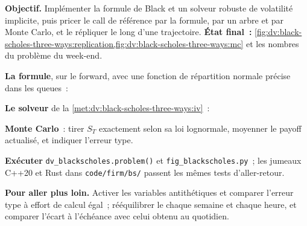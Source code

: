\begin{tutorial}
\textbf{Objectif.} Implémenter la formule de Black et un solveur robuste de volatilité implicite,
puis pricer le call de référence par la formule, par un arbre et par Monte Carlo, et le répliquer
le long d'une trajectoire. \textbf{État final~:}
\cref{fig:dv:black-scholes-three-ways:replication,fig:dv:black-scholes-three-ways:mc}
et les nombres du problème du week-end.
\begin{tutsteps}
\item \textbf{La formule}, sur le forward, avec une fonction de répartition normale précise dans les queues~:
\label{lst:dv:black-scholes-three-ways:black}
\item \textbf{Le solveur} de la \cref{met:dv:black-scholes-three-ways:iv}~:
\label{lst:dv:black-scholes-three-ways:iv}
\item \textbf{Monte Carlo}~: tirer $S_T$ exactement selon sa loi lognormale, moyenner le
payoff actualisé, et indiquer l'erreur type.
\label{lst:dv:black-scholes-three-ways:mc}
\item \textbf{Exécuter} \texttt{dv\_blackscholes.problem()} et
\texttt{fig\_blackscholes.py}~; les jumeaux C++20 et Rust dans
\texttt{code/firm/bs/} passent les mêmes tests d'aller-retour.
\end{tutsteps}
\textbf{Pour aller plus loin.} Activer les variables antithétiques et comparer l'erreur type
à effort de calcul égal~; rééquilibrer le  chaque semaine et chaque heure, et
comparer l'écart à l'échéance avec celui obtenu au quotidien.
\end{tutorial}

